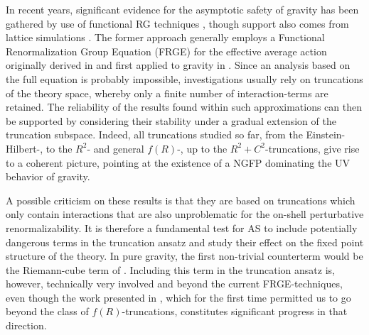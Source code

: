 \documentclass[preprint,preprintnumbers,amsmath,amssymb,nofootinbib,APS]{revtex4}
\newcommand{\2}{\sqrt{2\,}}
\begin{document}
In recent years, significant evidence for the asymptotic safety of gravity has been gathered by use of functional RG techniques \cite{ Reuter:1996cp,Souma:1999at,Lauscher:2001ya,Reuter:2001ag,Litim:2003vp, Granda:1998wn,Lauscher:2001rz,Lauscher:2001cq,Lauscher:2002mb, Codello:2007bd,Machado:2007ea,Codello:2008vh,us1,Forgacs:2002hz-Niedermaier:2002eq}, though support also comes from lattice simulations \cite{Ambjorn:2005db-2008wc}. The former approach generally employs a Functional Renormalization Group Equation (FRGE) for the effective average action originally derived in \cite{Wetterich:1992yh} and first applied to gravity in \cite{Reuter:1996cp}. Since an analysis based on the full equation is probably impossible, investigations usually rely on truncations of the theory space, whereby only a finite number of interaction-terms are retained. The reliability of the results found within such approximations can then be supported by considering their stability under a gradual extension of the truncation subspace. Indeed, all truncations studied so far,  from the Einstein-Hilbert-, to the $R^2$- and general $f(R)$-, up to the $R^2 + C^2$-truncations, give rise to a coherent picture, pointing at the existence of a NGFP dominating the UV behavior of gravity. 

A possible criticism on these results is that they are based on truncations which only contain interactions that are also unproblematic for the on-shell perturbative renormalizability. It is therefore a fundamental test for AS to include potentially dangerous terms in the truncation ansatz and study their effect on the fixed point structure of the theory. In pure gravity, the first non-trivial counterterm would be the Riemann-cube term of \cite{Goroff:1985sz,vandeVen:1991gw}. Including this term in the truncation ansatz is, however, technically very involved and beyond the current FRGE-techniques, even though the work presented in \cite{us1}, which for the first time permitted us to go beyond the class of $f(R)$-truncations, constitutes significant progress in that direction.
\end{document}
